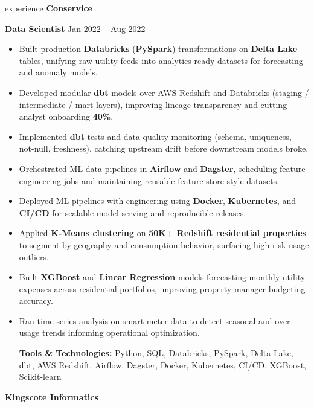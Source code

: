 \documentclass[25pt]{resume}
\begin{document}
\begin{ResumeSection}{experience}
    \textbf{\fontsize{13pt}{15pt}\selectfont Conservice }

    \textbf{Data Scientist} \hfill Jan 2022 -- Aug 2022
    \begin{itemize}
        \item Built production \textbf{Databricks} (\textbf{PySpark}) transformations on \textbf{Delta Lake} tables, unifying raw utility feeds into analytics-ready datasets for forecasting and anomaly models.
        \item Developed modular \textbf{dbt} models over AWS Redshift and Databricks (staging / intermediate / mart layers), improving lineage transparency and cutting analyst onboarding \textbf{40\%}.
        \item Implemented \textbf{dbt} tests and data quality monitoring (schema, uniqueness, not-null, freshness), catching upstream drift before downstream models broke.
        \item Orchestrated ML data pipelines in \textbf{Airflow} and \textbf{Dagster}, scheduling feature engineering jobs and maintaining reusable feature-store style datasets.
        \item Deployed ML pipelines with engineering using \textbf{Docker}, \textbf{Kubernetes}, and \textbf{CI/CD} for scalable model serving and reproducible releases.
        \item Applied \textbf{K-Means clustering} on \textbf{50K+ Redshift residential properties} to segment by geography and consumption behavior, surfacing high-risk usage outliers.
        \item Built \textbf{XGBoost} and \textbf{Linear Regression} models forecasting monthly utility expenses across residential portfolios, improving property-manager budgeting accuracy.
        \item Ran time-series analysis on smart-meter data to detect seasonal and over-usage trends informing operational optimization.

        \vspace{0.3\baselineskip}
        {\underline{\textbf{Tools \& Technologies:}} Python, SQL, Databricks, PySpark, Delta Lake, dbt, AWS Redshift, Airflow, Dagster, Docker, Kubernetes, CI/CD, XGBoost, Scikit-learn}
    \end{itemize}
    \vspace{0.5\baselineskip}

    \textbf{\fontsize{13pt}{15pt}\selectfont Kingscote Informatics }


\end{ResumeSection}
\end{document}
